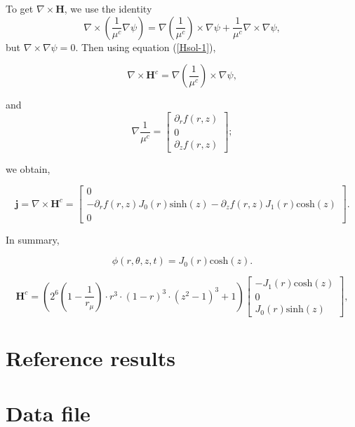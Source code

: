 \documentclass[a4paper]{book}
\def\data_dir{../MHD_DATA_TEST_CONV_PETSC}
\begin{document}
\noindent To get $\nabla \times \mathbf{H}$, we use the identity 
$$
\nabla \times \left (\frac{1}{{\mu}^c} \nabla \psi \right )= \nabla \left ( \frac{1}{{\mu}^c} \right ) \times  \nabla
\psi + \frac{1}{{\mu}^c} \nabla \times  \nabla \psi,
$$
but $\nabla \times  \nabla \psi = 0$. Then  using  equation (\ref{Hsol-1}), 

\begin{equation*}
\nabla \times \mathbf{H}^c=\nabla \left ( \frac{1}{{\mu}^c} \right ) \times  \nabla \psi, 
\end{equation*}

\noindent and 
\begin{equation}
 \nabla  \frac{1}{{\mu}^c}  =\left[ \begin{array}{c} \partial _r f(r,z) \\ 0  \\ \partial _z f(r,z) \end{array} \right];
\end{equation}

\noindent we obtain,

\begin{equation}
\mathbf{j} = \nabla \times \mathbf{H}^c=
\left[ \begin{array}{c}
0 \\ 
-\partial _r f(r,z) J_0(r)   \text{sinh}(z)  
-\partial _z f(r,z) J_1(r)    \text{cosh}(z) \\
 0
\end{array} \right].
\end{equation}

\noindent In summary,


\begin{equation}
\label{psi-sol1}
\phi(r,\theta,z,t)=J_0(r)\text{cosh}(z).
\end{equation}

\begin{equation}
\mathbf{H}^c= \left ( 2^6\left (1- \frac{1}{r_{\mu}}\right)\cdot r^3 \cdot (1-r)^3 \cdot (z^2-1)^3 +1\right)
\left[ \begin{array}{c} -J_1 (r)  \text{cosh}(z) \\ 0 \\J_0 (r)  \text{sinh}(z) \end{array} \right],
\end{equation}


\section{Reference results}
\section{Data file}

%
%
%
\end{document}
